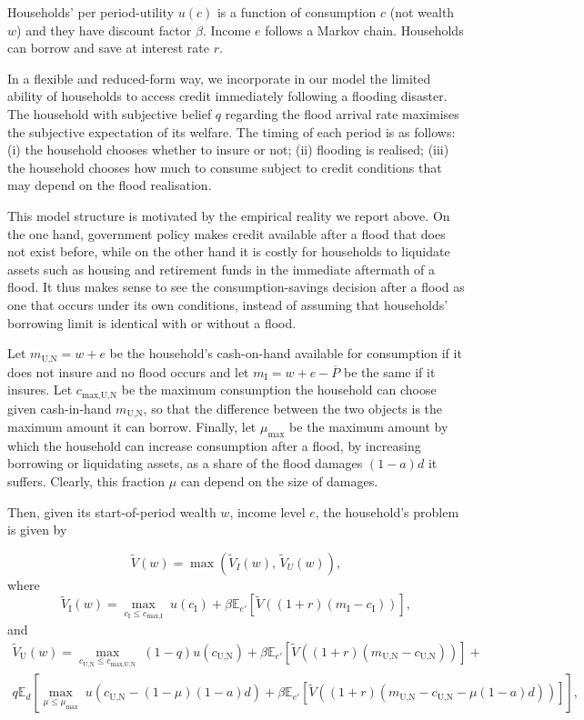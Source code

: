 \documentclass[12pt]{article}
\begin{document}
Households' per period-utility $u(c)$ is a function of consumption $c$ (not wealth $w$) and they have discount factor $\beta$. Income $e$ follows a Markov chain. Households can borrow and save at interest rate $r$.  

In a flexible and reduced-form way, we incorporate in our model the limited ability of households to access credit immediately following a flooding disaster. The household with subjective belief $q$ regarding the flood arrival rate maximises the subjective expectation of its welfare. The timing of each period is as follows: (i) the household chooses whether to insure or not; (ii) flooding is realised; (iii) the household chooses  how much to consume subject to credit conditions that may depend on the flood realisation.

This model structure is motivated by the empirical reality we report above. On the one hand, government policy makes credit available after a flood that does not exist before, while on the other hand it is costly for households to liquidate assets such as housing and retirement funds in the immediate aftermath of a flood. It thus makes sense to see the consumption-savings decision after a flood as one that occurs under its own conditions, instead of assuming that households' borrowing limit is identical with or without a flood.

Let $m_{\text{U,N}}=w+e$  be the household's cash-on-hand available for consumption if it does not insure and no flood occurs and let $m_{\text{I}}=w+e-\overline{P}$ be the same if it insures. Let $c_{\text{max,U,N}}$ be the maximum consumption the household can choose given cash-in-hand $m_{\text{U,N}}$, so that the difference between the two objects is the maximum amount it can borrow. Finally, let $\mu_\text{max}$ be the maximum amount by which the household can increase consumption after a flood, by increasing borrowing or liquidating assets, as a share of the flood damages $(1-a)d$ it suffers. Clearly, this fraction $\mu$ can depend on the size of damages.      

Then, given its start-of-period wealth $w$, income level $e$, the household's problem is given by 

\begin{equation}
\tilde{V}(w)=\max\left(\tilde{V}_{I}(w),\,\tilde{V}_{U}(w)\right),
\end{equation}
where
\begin{equation}
\tilde{V}_{\text{I}}(w)=\max_{c_{\text{I}}\leq c_{\text{max,I}}}\; u(c_{\text{I}})+\beta \mathbb{E}_{e'}[\tilde{V}((1+r)(m_\text{I}-c_{\text{I}}))],
\end{equation}
and
\begin{align}
\tilde{V}_{\text{U}}(w)=\max_{c_\text{U,N}\leq c_{\text{max,U,N}}}\; (1-q) u(c_\text{U,N})+\beta \mathbb{E}_{e'}[\tilde{V}((1+r)(m_\text{U,N}-c_\text{U,N}))]+ \nonumber \\
q\mathbb{E}_d[\max_{\mu\leq \mu_{\text{max}}}\; u(c_\text{U,N}-(1-\mu)(1-a)d)+\beta \mathbb{E}_{e'}[\tilde{V}((1+r)(m_\text{U,N}-c_\text{U,N}-\mu(1-a)d))]],
\end{align}
\end{document}
